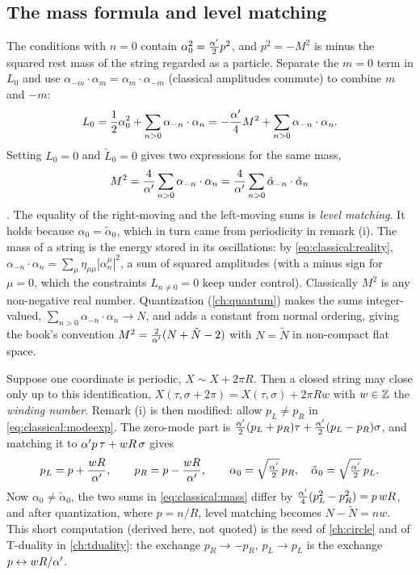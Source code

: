 \subsection{The mass formula and level matching}

The conditions with $n=0$ contain $\alpha_0^2=\frac{\alpha'}{2}p^2$, and $p^2=-M^2$ is minus the
squared rest mass of the string regarded as a particle. Separate the $m=0$ term in $L_0$ and
use $\alpha_{-m}\cdot\alpha_m=\alpha_m\cdot\alpha_{-m}$ (classical amplitudes commute) to
combine $m$ and $-m$:
\begin{equation}\label{eq:classical:L0}
  L_0=\frac12\alpha_0^2+\sum_{n>0}\alpha_{-n}\cdot\alpha_n=-\frac{\alpha'}{4}M^2+\sum_{n>0}\alpha_{-n}\cdot\alpha_n .
\end{equation}
Setting $L_0=0$ and $\tilde L_0=0$ gives two expressions for the same mass,
\begin{equation}\label{eq:classical:mass}
  M^2=\frac{4}{\alpha'}\sum_{n>0}\alpha_{-n}\cdot\alpha_n=\frac{4}{\alpha'}\sum_{n>0}\tilde\alpha_{-n}\cdot\tilde\alpha_n
\end{equation}
 \TL. The equality of the right-moving and the left-moving
sums is \emph{level matching}. It holds because
$\alpha_0=\tilde\alpha_0$, which in turn came from periodicity in remark (i). The mass of a
string is the energy stored in its oscillations: by \eqref{eq:classical:reality},
$\alpha_{-n}\cdot\alpha_n=\sum_\mu\eta_{\mu\mu}|\alpha_n^\mu|^2$, a sum of squared
amplitudes (with a minus sign for $\mu=0$, which the constraints $L_{n\neq0}=0$ keep under
control). Classically $M^2$ is any non-negative real number. Quantization
(\cref{ch:quantum}) makes the sums integer-valued, $\sum_{n>0}\alpha_{-n}\cdot\alpha_n\to N$,
and adds a constant from normal ordering, giving the book's convention
$M^2=\frac{2}{\alpha'}(N+\tilde N-2)$ with $N=\tilde N$ in non-compact flat space.

\begin{remark}\label{rem:classical:circle}
Suppose one coordinate is periodic, $X\sim X+2\pi R$. Then a closed string may close only up
to this identification, $X(\tau,\sigma+2\pi)=X(\tau,\sigma)+2\pi Rw$ with $w\in\mathbb{Z}$ the
\emph{winding number}. Remark (i) is then modified: allow
$p_L\neq p_R$ in \eqref{eq:classical:modeexp}. The zero-mode part is
$\tfrac{\alpha'}{2}(p_L+p_R)\tau+\tfrac{\alpha'}{2}(p_L-p_R)\sigma$, and matching it to
$\alpha' p\,\tau+wR\,\sigma$ gives
\begin{equation}\label{eq:classical:pLpR}
  p_L=p+\frac{wR}{\alpha'},\qquad p_R=p-\frac{wR}{\alpha'},\qquad
  \alpha_0=\sqrt{\tfrac{\alpha'}{2}}\,p_R,\quad\tilde\alpha_0=\sqrt{\tfrac{\alpha'}{2}}\,p_L .
\end{equation}
Now $\alpha_0\neq\tilde\alpha_0$, the two sums in \eqref{eq:classical:mass} differ by
$\frac{\alpha'}{4}(p_L^2-p_R^2)=p\,wR$, and after quantization, where $p=n/R$, level matching
becomes $N-\tilde N=nw$. This short computation (derived here, not quoted) is the seed of
\cref{ch:circle} and of T-duality in \cref{ch:tduality}: the exchange
$p_R\to-p_R$, $p_L\to p_L$ is the exchange $p\leftrightarrow wR/\alpha'$.
\end{remark}


